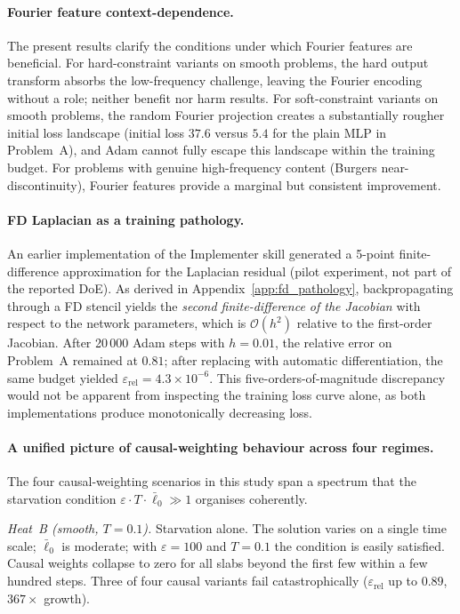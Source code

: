\documentclass{article}
\newcommand{\relL}{\varepsilon_{\mathrm{rel}}}
\begin{document}
\paragraph{Fourier feature context-dependence.}
The present results clarify the conditions under which Fourier features are
beneficial.
For hard-constraint variants on smooth problems, the hard output transform
absorbs the low-frequency challenge, leaving the Fourier encoding without a
role; neither benefit nor harm results.
For soft-constraint variants on smooth problems, the random Fourier projection
creates a substantially rougher initial loss landscape (initial loss $37.6$
versus $5.4$ for the plain MLP in Problem~A), and Adam cannot fully escape this
landscape within the training budget.
For problems with genuine high-frequency content (Burgers near-discontinuity),
Fourier features provide a marginal but consistent improvement.

\paragraph{FD Laplacian as a training pathology.}
An earlier implementation of the Implementer skill generated a 5-point
finite-difference approximation for the Laplacian residual (pilot experiment,
not part of the reported DoE).
As derived in Appendix~\ref{app:fd_pathology}, backpropagating through a FD
stencil yields the \emph{second finite-difference of the Jacobian} with
respect to the network parameters, which is $\mathcal{O}(h^2)$ relative to the
first-order Jacobian.
After 20\,000 Adam steps with $h=0.01$, the relative error on Problem~A
remained at $0.81$; after replacing with automatic differentiation, the same
budget yielded $\relL = 4.3\times10^{-6}$.
This five-orders-of-magnitude discrepancy would not be apparent from inspecting
the training loss curve alone, as both implementations produce monotonically
decreasing loss.

\paragraph{A unified picture of causal-weighting behaviour across four regimes.}
The four causal-weighting scenarios in this study span a spectrum that the
starvation condition $\varepsilon\cdot T\cdot\bar{\ell}_0 \gg 1$ organises coherently.

\emph{Heat~B (smooth, $T=0.1$).} Starvation alone. The solution varies on a
single time scale; $\bar{\ell}_0$ is moderate; with $\varepsilon=100$ and $T=0.1$
the condition is easily satisfied. Causal weights collapse to zero for all slabs
beyond the first few within a few hundred steps. Three of four causal variants
fail catastrophically ($\relL$ up to $0.89$, $367\times$ growth).
\end{document}
